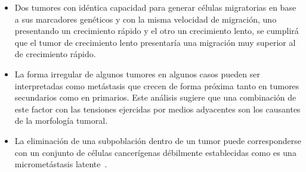 \begin{itemize}
\item Dos tumores con id\'entica capacidad para generar c\'elulas migratorias en base a sus marcadores gen\'eticos y con la misma velocidad de migraci\'on, uno presentando un crecimiento r\'apido y el otro un crecimiento lento, se cumplir\'a que el tumor de crecimiento lento presentar\'ia una migraci\'on muy superior al de crecimiento r\'apido.

\item La forma irregular de algunos tumores en algunos casos pueden ser interpretadas como met\'astasis que crecen de forma pr\'oxima tanto en tumores secundarios como en primarios. Este an\'alisis sugiere que una combinaci\'on de este factor con las tensiones ejercidas por medios adyacentes son los causantes de la morfolog\'ia tumoral. 

\item La eliminaci\'on de una subpoblaci\'on dentro de un tumor puede corresponderse con un conjunto de c\'elulas cancer\'igenas d\'ebilmente establecidas como es una micromet\'astasis latente~\cite{robins}. 
\end{itemize}

